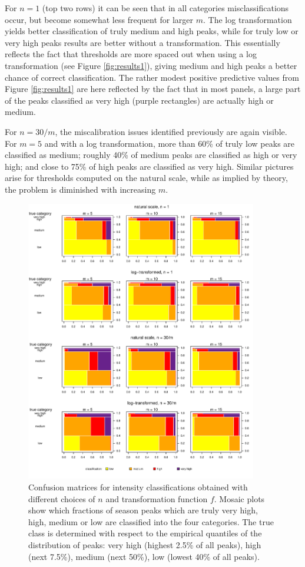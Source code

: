\documentclass{article}
\begin{document}
For $n = 1$ (top two rows) it can be seen that in all categories misclassifications occur, but become somewhat less frequent for larger $m$. The log transformation yields better classification of truly medium and high peaks, while for truly low or very high peaks results are better without a transformation. This essentially reflects the fact that thresholds are more spaced out when using a log transformation (see Figure \ref{fig:results1}), giving medium and high peaks a better chance of correct classification. The rather modest positive predictive values from Figure \ref{fig:results1} are here reflected by the fact that in most panels, a large part of the peaks classified as very high (purple rectangles) are actually high or medium.

For $n = 30/m$, the miscalibration issues identified previously are again visible. For $m = 5$ and with a log transformation, more than 60\% of truly low peaks are classified as medium; roughly 40\% of medium peaks are classified as high or very high; and close to 75\% of high peaks are classified as very high. Similar pictures arise for thresholds computed on the natural scale, while as implied by theory, the problem is diminished with increasing $m$.

\begin{figure}
\includegraphics[width=0.9\textwidth]{figure/mosaic_fr.pdf}
\caption{Confusion matrices for intensity classifications obtained with different choices of $n$ and transformation function $f$. Mosaic plots show which fractions of season peaks which are truly very high, high, medium or low are classified into the four categories. The true class is determined with respect to the empirical quantiles of the distribution of peaks: very high (highest 2.5\% of all peaks), high (next 7.5\%), medium (next 50\%), low (lowest 40\% of all peaks).}
\label{fig:mosaic}
\end{figure}
\end{document}
